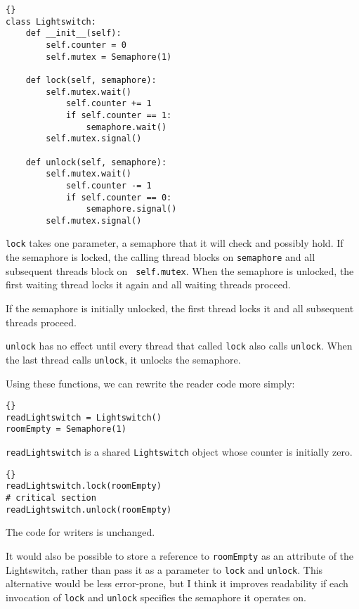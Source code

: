 \documentclass{book}
\begin{document}
\begin{lstlisting}[title={Lightswitch definition}]{}
class Lightswitch:
    def __init__(self):
        self.counter = 0
        self.mutex = Semaphore(1)

    def lock(self, semaphore):
        self.mutex.wait()
            self.counter += 1
            if self.counter == 1:
                semaphore.wait()
        self.mutex.signal()

    def unlock(self, semaphore):
        self.mutex.wait()
            self.counter -= 1
            if self.counter == 0:
                semaphore.signal()
        self.mutex.signal()
\end{lstlisting}

{\tt lock} takes one parameter, a semaphore that it will check and
possibly hold.  If the semaphore is locked, the calling thread blocks
on {\tt semaphore} and all subsequent threads block on {\tt
self.mutex}.  When the semaphore is unlocked, the first waiting thread
locks it again and all waiting threads proceed.

If the semaphore is initially unlocked, the first thread locks it
and all subsequent threads proceed.

{\tt unlock} has no effect until every thread that called {\tt lock}
also calls {\tt unlock}.  When the last thread calls {\tt unlock}, it
unlocks the semaphore.

\newpage
Using these functions, we can rewrite the reader code
more simply:

\begin{lstlisting}[title={Readers-writers initialization}]{}
readLightswitch = Lightswitch()
roomEmpty = Semaphore(1)
\end{lstlisting}

{\tt readLightswitch} is a shared {\tt Lightswitch} object whose counter
is initially zero.

\begin{lstlisting}[title={Readers-writers solution (reader)}]{}
readLightswitch.lock(roomEmpty)
# critical section
readLightswitch.unlock(roomEmpty)
\end{lstlisting}

The code for writers is unchanged.

It would also be possible to store a reference to {\tt roomEmpty}
as an attribute of the Lightswitch, rather than pass it as a parameter
to {\tt lock} and {\tt unlock}.  This alternative would be less
error-prone, but I think it improves readability if each invocation
of {\tt lock} and {\tt unlock} specifies the semaphore it operates on.
\end{document}
